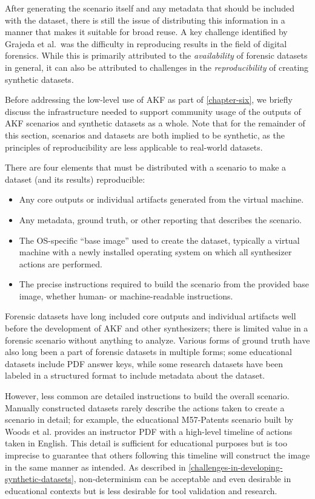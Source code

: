 \documentclass[letterpaper,12pt]{report}
\def\tightlist{}
\begin{document}
After generating the scenario itself and any metadata that should be
included with the dataset, there is still the issue of distributing this
information in a manner that makes it suitable for broad reuse. A key
challenge identified by Grajeda et al.~was the difficulty in reproducing
results in the field of digital forensics. While this is primarily
attributed to the \emph{availability} of forensic datasets in general,
it can also be attributed to challenges in the \emph{reproducibility} of
creating synthetic datasets.

Before addressing the low-level use of AKF as part of \autoref{chapter-six}, we briefly discuss the infrastructure needed to
support community usage of the outputs of AKF scenarios and synthetic
datasets as a whole. Note that for the remainder of this section,
scenarios and datasets are both implied to be synthetic, as the
principles of reproducibility are less applicable to real-world
datasets.

There are four elements that must be distributed with a scenario to make
a dataset (and its results) reproducible:

\begin{itemize}
\tightlist
\item
  Any core outputs or individual artifacts generated from the virtual
  machine.
\item
  Any metadata, ground truth, or other reporting that describes the
  scenario.
\item
  The OS-specific ``base image'' used to create the dataset, typically a
  virtual machine with a newly installed operating system on which all
  synthesizer actions are performed.
\item
  The precise instructions required to build the scenario from the
  provided base image, whether human- or machine-readable instructions.
\end{itemize}

Forensic datasets have long included core outputs and individual
artifacts well before the development of AKF and other synthesizers;
there is limited value in a forensic scenario without anything to
analyze. Various forms of ground truth have also long been a part of
forensic datasets in multiple forms; some educational datasets include
PDF answer keys, while some research datasets have been labeled in a
structured format to include metadata about the dataset.

However, less common are detailed instructions to build the overall
scenario. Manually constructed datasets rarely describe the actions
taken to create a scenario in detail; for example, the educational
M57-Patents scenario built by Woods et al.
\cite{woodsCreatingRealisticCorpora2011} provides an instructor PDF
with a high-level timeline of actions taken in English. This detail is
sufficient for educational purposes but is too imprecise to guarantee
that others following this timeline will construct the image in the same
manner as intended. As described in \autoref{challenges-in-developing-synthetic-datasets}, non-determinism can be
acceptable and even desirable in educational contexts but is less
desirable for tool validation and research.
\end{document}
